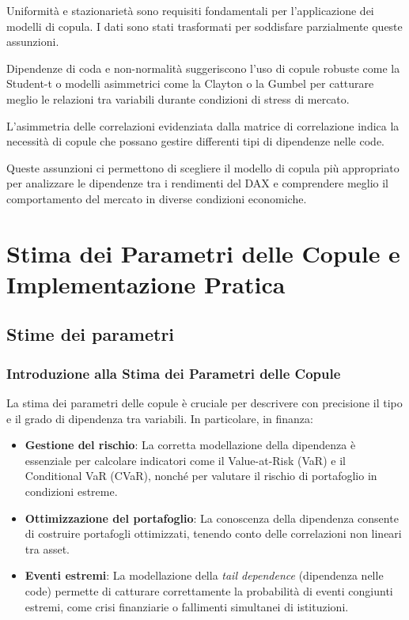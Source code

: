 \documentclass[%
	corpo=11pt,
    twoside,
    stile=classica,
    oldstyle,
    tipotesi=custom,
    greek,
    evenboxes,
]{toptesi}
\begin{document}
Uniformità e stazionarietà sono requisiti fondamentali per l’applicazione dei modelli di copula. I dati sono stati trasformati per soddisfare parzialmente queste assunzioni.

Dipendenze di coda e non-normalità suggeriscono l’uso di copule robuste come la Student-t o modelli asimmetrici come la Clayton o la Gumbel per catturare meglio le relazioni tra variabili durante condizioni di stress di mercato.

L'asimmetria delle correlazioni evidenziata dalla matrice di correlazione indica la necessità di copule che possano gestire differenti tipi di dipendenze nelle code.

Queste assunzioni ci permettono di scegliere il modello di copula più appropriato per analizzare le dipendenze tra i rendimenti del DAX e comprendere meglio il comportamento del mercato in diverse condizioni economiche.




\part{Stima dei Parametri delle
	Copule e Implementazione
	Pratica}

\chapter{Stime dei parametri}

\section{Introduzione alla Stima dei Parametri delle Copule}

La stima dei parametri delle copule è cruciale per descrivere con precisione il tipo e il grado di dipendenza tra variabili. In particolare, in finanza:

\begin{itemize}
	\item \textbf{Gestione del rischio}: La corretta modellazione della dipendenza è essenziale per calcolare indicatori come il Value-at-Risk (VaR) e il Conditional VaR (CVaR), nonché per valutare il rischio di portafoglio in condizioni estreme.
	\item \textbf{Ottimizzazione del portafoglio}: La conoscenza della dipendenza consente di costruire portafogli ottimizzati, tenendo conto delle correlazioni non lineari tra asset.
	\item \textbf{Eventi estremi}: La modellazione della \textit{tail dependence} (dipendenza nelle code) permette di catturare correttamente la probabilità di eventi congiunti estremi, come crisi finanziarie o fallimenti simultanei di istituzioni.
\end{itemize}
\end{document}
